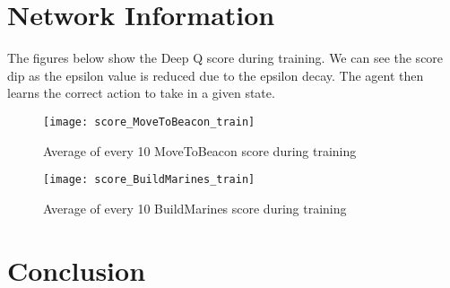 \section{Network Information}

The figures below show the Deep Q score during training. We can see the score
dip as the epsilon value is reduced due to the epsilon decay. The agent then
learns the correct action to take in a given state.

\begin{figure}[h]
  \centering
  \begin{minipage}[b]{0.4\textwidth}
    \texttt{[image: score\_MoveToBeacon\_train]}
    \caption{Average of every 10 MoveToBeacon score during training}
  \end{minipage}
  \hfill
  \begin{minipage}[b]{0.4\textwidth}
    \texttt{[image: score\_BuildMarines\_train]}
    \caption{Average of every 10 BuildMarines score during training}
  \end{minipage}
\end{figure}


\section{Conclusion}

